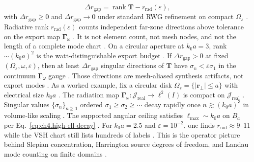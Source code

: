 \begin{equation}
\label{eq:ch4.rank-gap}
\Delta r_{\mathrm{gap}}
=
\operatorname{rank}\mathbf{T}-r_{\mathrm{rad}}(\varepsilon),
\end{equation}
with \(\Delta r_{\mathrm{gap}}\ge0\) and \(\Delta r_{\mathrm{gap}}\to0\) under standard RWG refinement on compact
\(\Omega_{s}\) \cite{harrington2001}.
Radiative rank $r_{\mathrm{rad}}(\varepsilon)$ counts independent far-zone directions above tolerance on the export map $\boldsymbol{\Gamma}_\omega$ \cite{harrington2001}. It is not element count, not mesh nodes, and not the length of a complete mode chart \cite{stratton1941}. On a circular aperture at $k_0 a=3$, rank $\sim (k_0 a)^2$ is the watt-distinguishable export budget \cite{jackson1999}.
\label{lem:ch4.rank-gap-aliasing}
If \(\Delta r_{\mathrm{gap}}>0\) at fixed \((\Omega_{s},\omega,\varepsilon)\), then at least
\(\Delta r_{\mathrm{gap}}\) singular directions of \(\mathbf{T}\) have \(\sigma_{n}<\varepsilon\sigma_{1}\) in the
continuum \(\boldsymbol{\Gamma}_\omega\) gauge \cite{stratton1941}. Those directions are
mesh-aliased synthesis artifacts, not export modes \cite{devaney2004}.
As a worked example, fix a circular disk $\Omega_{s}=\{|\mathbf{r}_{\perp}|\le a\}$ with electrical size $k_{0}a$
\cite{stratton1941}.
The radiation map $\boldsymbol{\Gamma}_\omega:\mathcal{J}_{\mathrm{real}}\to\ell^{2}(I)$ is compact on
$\mathcal{J}_{\mathrm{real}}$ \cite{harrington2001}.
Singular values $\{\sigma_{n}\}_{n\ge1}$ ordered $\sigma_{1}\ge\sigma_{2}\ge\cdots$ decay rapidly once
$n\gtrsim(k_{0}a)^{3}$ in volume-like scaling \cite{hansen1988}.
The supported angular ceiling satisfies $\ell_{\max}\sim k_{0}a$ on $B_{a}$ per
Eq.~\eqref{eq:ch4.high-ell-decay} \cite{hansen1988}.
For $k_{0}a=2.5$ and $\varepsilon=10^{-2}$, one finds $r_{\mathrm{rad}}\approx9$--$11$ while the VSH chart still
lists hundreds of labels \cite{harrington2001}.
This is the operator picture behind Slepian concentration, Harrington source degrees of freedom, and Landau mode
counting on finite domains \cite{slepian1961}.
